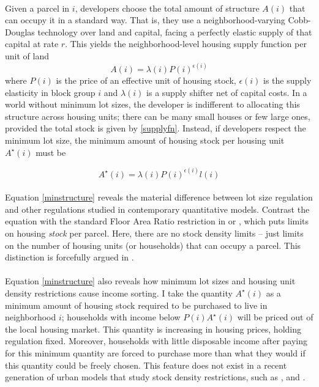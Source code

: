 \documentclass[]{article}
\begin{document}
\paragraph*{}
Given a parcel in $i$, developers choose the total amount of structure $A(i)$ that can occupy it in a standard way. That is, they use a neighborhood-varying Cobb-Douglas technology over land and capital, facing a perfectly elastic supply of that capital at rate $r$. This yields the neighborhood-level housing supply function per unit of land
\begin{equation}\label{supplyfn}
	A(i) = \lambda(i)P(i)^{\epsilon(i)}
\end{equation}
where $P(i)$ is the price of an effective unit of housing stock, $\epsilon(i)$ is the supply elasticity in block group $i$ and $\lambda(i)$ is a supply shifter net of capital costs. In a world without minimum lot sizes, the developer is indifferent to allocating this structure across housing units; there can be many small houses or few large ones, provided the total stock is given by \eqref{supplyfn}. Instead, if developers respect the minimum lot size, the minimum amount of housing stock per housing unit $A^{\star}(i)$ must be

\begin{equation}\label{minstructure}
	A^{\star}(i) = \lambda(i)P(i)^{\epsilon(i)}l(i)
\end{equation}

\paragraph*{}
Equation \eqref{minstructure} reveals the material difference between lot size regulation and other regulations studied in contemporary quantitative models. Contrast the equation with the standard Floor Area Ratio restriction in \cite{bruecknersingh} or \cite{BruecknerFuGu}, which puts limits on housing \textit{stock} per parcel. Here, there are no stock density  limits -- just limits on the number of housing units (or households) that can occupy a parcel. This distinction is forcefully argued in \cite{griesonwhite}.

\paragraph*{}
Equation \eqref{minstructure} also reveals how minimum lot sizes and housing unit density restrictions cause income sorting. I take the quantity $A^{\star}(i)$ as a minimum amount of housing stock required to be purchased to live in neighborhood $i$; households with income below $P(i)A^{\star}(i)$ will be priced out of the local housing market. This quantity is increasing in housing prices, holding regulation fixed. Moreover, households with little disposable income after paying for this minimum quantity are forced to purchase more than what they would if this quantity could be freely chosen. This feature does not exist in a recent generation of urban models that study stock density restrictions, such as \cite{acosta}, \cite{martynov} and \cite{anagoletal2021}. 
\end{document}
